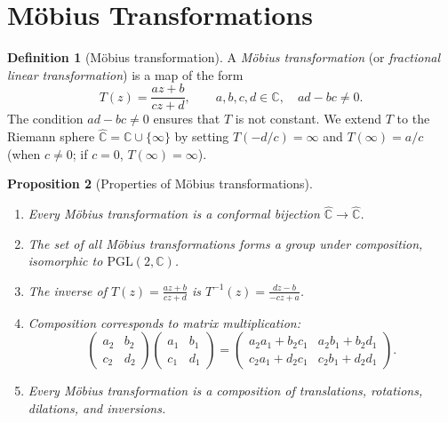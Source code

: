 \documentclass[12pt,a4paper,openany]{book}
\theoremstyle{definition}
\newtheorem{definition}{Definition}[chapter]
\theoremstyle{plain}
\newtheorem{proposition}[definition]{Proposition}
\theoremstyle{remark}
\newcommand{\C}{\mathbb{C}}
\begin{document}
\section{M\"obius Transformations}\label{sec:mobius}

\begin{definition}[M\"obius transformation]\label{def:mobius}
A \emph{M\"obius transformation} (or \emph{fractional linear
transformation}) is a map of the form
\[
  T(z)=\frac{az+b}{cz+d},\qquad a,b,c,d\in\C,\quad ad-bc\neq 0.
\]
The condition $ad-bc\neq 0$ ensures that $T$ is not constant.
We extend $T$ to the Riemann sphere $\hat{\C}=\C\cup\{\infty\}$ by
setting $T(-d/c)=\infty$ and $T(\infty)=a/c$ (when $c\neq 0$; if $c=0$,
$T(\infty)=\infty$).
\end{definition}

\begin{proposition}[Properties of M\"obius transformations]\label{prop:mobius-props}
\begin{enumerate}[label=(\roman*)]
  \item Every M\"obius transformation is a conformal bijection
        $\hat{\C}\to\hat{\C}$.
  \item The set of all M\"obius transformations forms a group under
        composition, isomorphic to $\mathrm{PGL}(2,\C)$.
  \item The inverse of $T(z)=\frac{az+b}{cz+d}$ is
        $T^{-1}(z)=\frac{dz-b}{-cz+a}$.
  \item Composition corresponds to matrix multiplication:
        \[
          \begin{pmatrix}a_2&b_2\\c_2&d_2\end{pmatrix}
          \begin{pmatrix}a_1&b_1\\c_1&d_1\end{pmatrix}
          =\begin{pmatrix}a_2a_1+b_2c_1 & a_2b_1+b_2d_1 \\
                          c_2a_1+d_2c_1 & c_2b_1+d_2d_1\end{pmatrix}.
        \]
  \item Every M\"obius transformation is a composition of translations,
        rotations, dilations, and inversions.
\end{enumerate}
\end{proposition}
\end{document}
